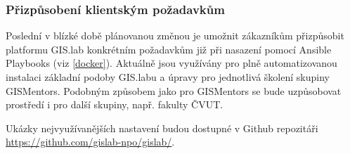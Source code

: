 \subsubsection{Přizpůsobení klientským požadavkům}
Poslední v blízké době plánovanou změnou je umožnit zákazníkům
přizpůsobit platformu GIS.lab konkrétním požadavkům již při nasazení
pomocí Ansible Playbooks (viz \ref{docker}). Aktuálně jsou využívány
pro plně automatizovanou instalaci základní podoby GIS.labu a úpravy
pro jednotlivá školení skupiny GISMentors. Podobným způsobem jako pro
GISMentors se bude uzpůsobovat prostředí i pro další skupiny,
např. fakulty ČVUT.

Ukázky nejvyužívanějších nastavení budou dostupné v Github
repozitáři 
\href{https://github.com/gislab-npo/gislab/}{https://github.com/gislab-npo/gislab/}.

